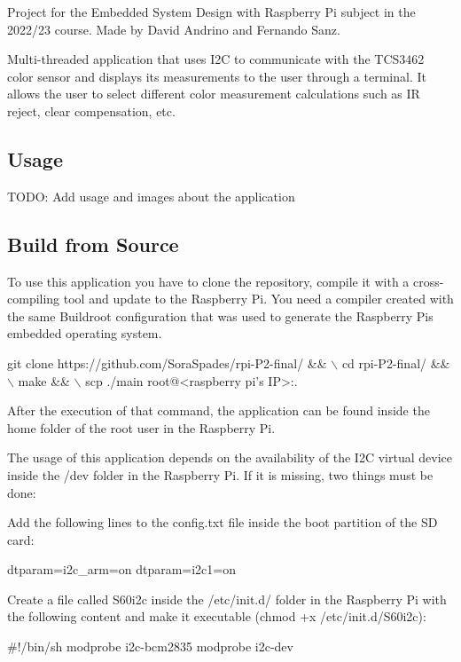 Project for the Embedded System Design with Raspberry Pi subject in the 2022/23 course. Made by David Andrino and Fernando Sanz.

Multi-\/threaded application that uses I2C to communicate with the T\+C\+S3462 color sensor and displays its measurements to the user through a terminal. It allows the user to select different color measurement calculations such as IR reject, clear compensation, etc.

\subsection*{Usage}

T\+O\+DO\+: Add usage and images about the application

\subsection*{Build from Source}

To use this application you have to clone the repository, compile it with a cross-\/compiling tool and update to the Raspberry Pi. You need a compiler created with the same Buildroot configuration that was used to generate the Raspberry Pi\textquotesingle{}s embedded operating system.


\begin{DoxyCode}
git clone https://github.com/SoraSpades/rpi-P2-final/ && \(\backslash\)
cd rpi-P2-final/ && \(\backslash\)
make && \(\backslash\)
scp ./main root@<raspberry pi's IP>:.
\end{DoxyCode}


After the execution of that command, the application can be found inside the home folder of the root user in the Raspberry Pi.

The usage of this application depends on the availability of the I2C virtual device inside the {\ttfamily /dev} folder in the Raspberry Pi. If it is missing, two things must be done\+:
\begin{DoxyEnumerate}
\item Add the following lines to the {\ttfamily config.\+txt} file inside the boot partition of the SD card\+: 
\begin{DoxyCode}
dtparam=i2c\_arm=on
dtparam=i2c1=on
\end{DoxyCode}

\item Create a file called {\ttfamily S60i2c} inside the {\ttfamily /etc/init.d/} folder in the Raspberry Pi with the following content and make it executable ({\ttfamily chmod +x /etc/init.d/\+S60i2c})\+: 
\begin{DoxyCode}
#!/bin/sh
modprobe i2c-bcm2835
modprobe i2c-dev
\end{DoxyCode}

\end{DoxyEnumerate}

